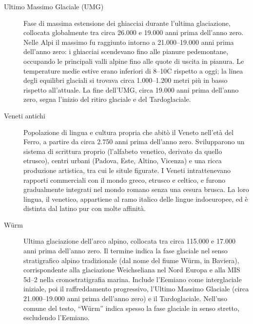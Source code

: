 \begin{description}
\item[Ultimo Massimo Glaciale (UMG)] Fase di massima estensione dei ghiacciai durante l'ultima glaciazione, collocata globalmente tra circa 26.000 e 19.000 anni prima dell'anno zero. Nelle Alpi il massimo fu raggiunto intorno a 21.000--19.000 anni prima dell'anno zero: i ghiacciai scendevano fino alle pianure pedemontane, occupando le principali valli alpine fino alle quote di uscita in pianura. Le temperature medie estive erano inferiori di 8--10\textdegree C rispetto a oggi; la linea degli equilibri glaciali si trovava circa 1.000--1.200 metri più in basso rispetto all'attuale. La fine dell'UMG, circa 19.000 anni prima dell'anno zero, segna l'inizio del ritiro glaciale e del Tardoglaciale.

\item[Veneti antichi] Popolazione di lingua e cultura propria che abitò il Veneto nell'età del Ferro, a partire da circa 2.750 anni prima dell'anno zero. Svilupparono un sistema di scrittura proprio (l'alfabeto venetico, derivato da quello etrusco), centri urbani (Padova, Este, Altino, Vicenza) e una ricca produzione artistica, tra cui le situle figurate. I Veneti intrattenevano rapporti commerciali con il mondo greco, etrusco e celtico, e furono gradualmente integrati nel mondo romano senza una cesura brusca. La loro lingua, il venetico, appartiene al ramo italico delle lingue indoeuropee, ed è distinta dal latino pur con molte affinità.

\item[Würm] Ultima glaciazione dell'arco alpino, collocata tra circa 115.000 e 17.000 anni prima dell'anno zero. Il termine indica la fase glaciale nel senso stratigrafico alpino tradizionale (dal nome del fiume Würm, in Baviera), corrispondente alla glaciazione Weichseliana nel Nord Europa e alla MIS 5d--2 nella cronostratigrafia marina. Include l'Eemiano come interglaciale iniziale, poi il raffreddamento progressivo, l'Ultimo Massimo Glaciale (circa 21.000--19.000 anni prima dell'anno zero) e il Tardoglaciale. Nell'uso comune del testo, ``Würm'' indica spesso la fase glaciale in senso stretto, escludendo l'Eemiano.

\end{description}
